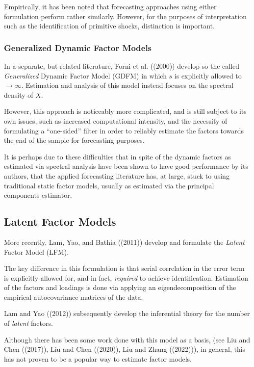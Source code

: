 \documentclass[
]{article}
\begin{document}
Empirically, it has been noted that forecasting approaches using either
formulation perform rather similarly. However, for the purposes of
interpretation such as the identification of primitive shocks,
distinction is important.

\hypertarget{generalized-dynamic-factor-models}{%
\subsubsection{Generalized Dynamic Factor
Models}\label{generalized-dynamic-factor-models}}

In a separate, but related literature, Forni et al. ((2000)) develop so
the called \emph{Generalized} Dynamic Factor Model (GDFM) in which \(s\)
is explicitly allowed to \(\to \infty\). Estimation and analysis of this
model instead focuses on the spectral density of \(X\).

However, this approach is noticeably more complicated, and is still
subject to its own issues, such as increased computational intensity,
and the necessity of formulating a ``one-sided'' filter in order to
reliably estimate the factors towards the end of the sample for
forecasting purposes.

It is perhaps due to these difficulties that in spite of the dynamic
factors as estimated via spectral analysis have been shown to have good
performance by its authors, that the applied forecasting literature has,
at large, stuck to using traditional static factor models, usually as
estimated via the principal components estimator.

\hypertarget{latent-factor-models}{%
\subsection{Latent Factor Models}\label{latent-factor-models}}

More recently, Lam, Yao, and Bathia ((2011)) develop and formulate the
\emph{Latent} Factor Model (LFM).

The key difference in this formulation is that serial correlation in the
error term is explicitly allowed for, and in fact, \emph{required} to
achieve identification. Estimation of the factors and loadings is done
via applying an eigendecomposition of the empirical autocovariance
matrices of the data.

Lam and Yao ((2012)) subsequently develop the inferential theory for the
number of \emph{latent} factors.

Although there has been some work done with this model as a basis, (see
Liu and Chen ((2017)), Liu and Chen ((2020)), Liu and Zhang ((2022))),
in general, this has not proven to be a popular way to estimate factor
models.
\end{document}
